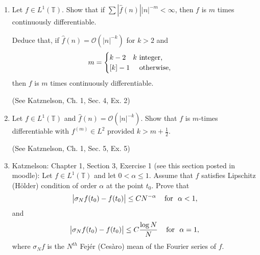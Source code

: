 \documentclass[a4paper]{article}
\begin{document}
\begin{enumerate}
\begin{proof}
  We know $c_0 = \hat{f}(0)$, so the claim is true for trigonometric polynomials.

  Now take an arbitrary $f \in L^1$. We can approximate $f$ by a trigonometric polynomial in the $L^1$ norm. So for any $\varepsilon > 0$, we can find
  a trigonometric polynomial $P(t)$ such that $\|f-P\|_{L^1} < \varepsilon$. Then
  \begin{align*}
    \left| \int_{0}^{1} \left( f(t) - P(t) \right) g(nt) dt \right| &\leq \|g\|_{L^\infty} \|f - P\|_{L^1} \\
    &< \|g\|_{L^\infty} \varepsilon
  \end{align*}

  Letting $\varepsilon \to 0$, we get the result for all $f \in L^{1}$.

\end{proof}

\item  Let $f \in L^1 (\mathbb T)$. Show that if $\sum | \widehat{f} (n) | |n|^{-m} < \infty$, then $f$ is $m$ times continuously differentiable.

Deduce that, if $\widehat{f} (n ) = \mathcal O (|n|^{-k})$ for $k>2$ and $$ m = \begin{cases} k-2 \quad k \textup{ integer, } \\ [k]-1 \quad \textup{ otherwise, } \end{cases}$$ then $f$ is $m$ times continuously differentiable.

(See Katznelson, Ch. 1, Sec. 4, Ex. 2)

\item Let $f \in L^1 (\mathbb T)$ and $ \widehat{f} (n ) = \mathcal O (|n|^{-k})$. Show that $f$ is $m$-times  differentiable with $f^{(m)} \in L^2$ provided $k> m +\frac12$.

(See Katznelson, Ch. 1, Sec. 5, Ex. 5)

\item Katznelson: Chapter 1, Section 3, Exercise 1 (see this section posted in moodle): Let $f \in L^ 1(\mathbb T)$ and let $0< \alpha \le1$. Assume that $f$ satisfies Lipschitz (H\"older) condition of order $\alpha$ at the point $t_0$. Prove that
$$ \big| \sigma_N f (t_0)   - f(t_0) \big| \le C N^{-\alpha} \,\,\,\,\, \textup{ for } \,\, \alpha<1,$$
and
$$ \big| \sigma_N f (t_0)   - f(t_0) \big| \le C \frac{\log N}{N} \,\,\,\,\, \textup{ for } \,\, \alpha=1,$$
where $\sigma_N f $ is the $N^{th}$ Fej\'er (Ces\`aro) mean of the Fourier series of $f$.

\end{enumerate}
\end{document}

